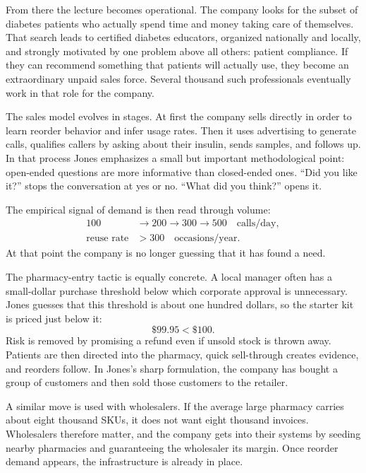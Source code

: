From there the lecture becomes operational. The company looks for the subset of diabetes patients who actually spend time and money taking care of themselves. That search leads to certified diabetes educators, organized nationally and locally, and strongly motivated by one problem above all others: patient compliance. If they can recommend something that patients will actually use, they become an extraordinary unpaid sales force. Several thousand such professionals eventually work in that role for the company.

The sales model evolves in stages. At first the company sells directly in order to learn reorder behavior and infer usage rates. Then it uses advertising to generate calls, qualifies callers by asking about their insulin, sends samples, and follows up. In that process Jones emphasizes a small but important methodological point: open-ended questions are more informative than closed-ended ones. ``Did you like it?'' stops the conversation at yes or no. ``What did you think?'' opens it.

The empirical signal of demand is then read through volume:
\begin{align}
100 &\to 200 \to 300 \to 500 \quad \text{calls/day},\\
\text{reuse rate} &> 300 \quad \text{occasions/year}.
\end{align}
At that point the company is no longer guessing that it has found a need.

The pharmacy-entry tactic is equally concrete. A local manager often has a small-dollar purchase threshold below which corporate approval is unnecessary. Jones guesses that this threshold is about one hundred dollars, so the starter kit is priced just below it:
\begin{equation}
\$99.95<\$100.
\end{equation}
Risk is removed by promising a refund even if unsold stock is thrown away. Patients are then directed into the pharmacy, quick sell-through creates evidence, and reorders follow. In Jones's sharp formulation, the company has bought a group of customers and then sold those customers to the retailer.

A similar move is used with wholesalers. If the average large pharmacy carries about eight thousand SKUs, it does not want eight thousand invoices. Wholesalers therefore matter, and the company gets into their systems by seeding nearby pharmacies and guaranteeing the wholesaler its margin. Once reorder demand appears, the infrastructure is already in place.

